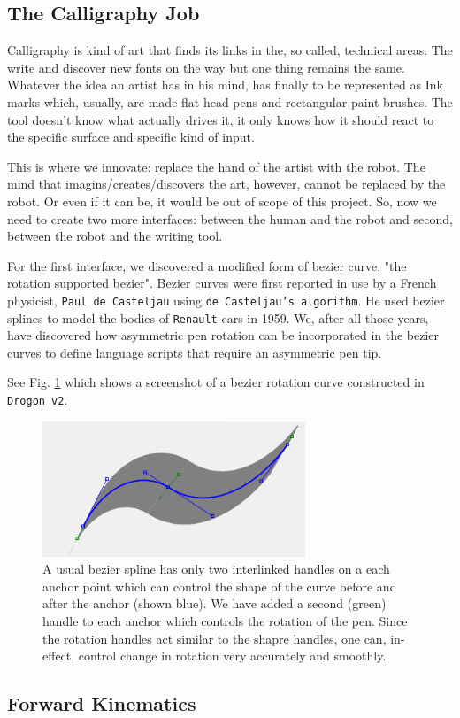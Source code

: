 \subsection{The Calligraphy Job}
{
        Calligraphy is kind of art that finds its links in the, so called, technical areas. The write and discover new fonts on the way but one thing remains the same. Whatever the idea an artist has in his mind, has finally to be represented as Ink marks which, usually, are made flat head pens and rectangular paint brushes. The tool doesn't know what actually drives it, it only knows how it should react to the specific surface and specific kind of input.

        This is where we innovate: replace the hand of the artist with the robot. The mind that imagins/creates/discovers the art, however, cannot be replaced by the robot. Or even if it can be, it would be out of scope of this project. So, now we need to create two more interfaces: between the human and the robot and second, between the robot and the writing tool.

        For the first interface, we discovered a modified form of bezier curve, "the rotation supported bezier". Bezier curves were first reported in use by a French physicist, \texttt{Paul de Casteljau} using \texttt{de Casteljau's algorithm}. He used bezier splines to model the bodies of \texttt{Renault} cars in 1959. We, after all those years, have discovered how asymmetric pen rotation can be incorporated in the bezier curves to define language scripts that require an asymmetric pen tip.

        See Fig. \ref{FigBezier} which shows a screenshot of a bezier rotation curve constructed in \texttt{Drogon v2}.

        \begin{figure}
          \centering
          \includegraphics[width=0.7\textwidth]{bezier.png}
          \caption{A usual bezier spline has only two interlinked handles on a each anchor point which can control the shape of the curve before and after the anchor (shown blue). We have added a second (green) handle to each anchor which controls the rotation of the pen. Since the rotation handles act similar to the shapre handles, one can, in-effect, control change in rotation very accurately and smoothly.
          } \label{FigBezier}
        \end{figure}

    }
\subsection{Forward Kinematics} 